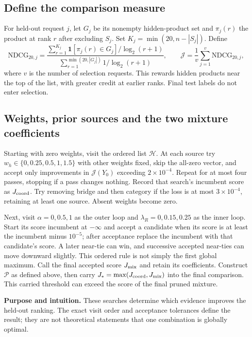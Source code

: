 \documentclass[11pt,a4paper]{article}
\newcommand{\why}{\par\textbf{Purpose and intuition.} }
\numberwithin{equation}{section}
\begin{document}
\subsection{Define the comparison measure}
For held-out request $j$, let $G_j$ be its nonempty hidden-product set and $\pi_j(r)$
the product at rank $r$ after excluding $S_j$. Set $K_j=\min(20,n-|S_j|)$. Define
\begin{equation}
\mathrm{NDCG}_{20,j}=\frac{\sum_{r=1}^{K_j}\mathbf1[\pi_j(r)\in G_j]/\log_2(r+1)}
{\sum_{r=1}^{\min(20,|G_j|)}1/\log_2(r+1)},\qquad
\mathcal J=\frac1v\sum_{j=1}^v\mathrm{NDCG}_{20,j},
\end{equation}
where $v$ is the number of selection requests. This rewards hidden products near the top
of the list, with greater credit at earlier ranks. Final test labels do not enter selection.

\subsection{Weights, prior sources and the two mixture coefficients}
Starting with zero weights, visit the ordered list $\mathcal H$. At each source try
$w_h\in\{0,0.25,0.5,1,1.5\}$ with other weights fixed, skip the all-zero vector, and
accept only improvements in $\mathcal J(Y_0)$ exceeding $2\times10^{-4}$. Repeat for at
most four passes, stopping if a pass changes nothing. Record that search's incumbent score
as $J_{\rm coord}$. Try removing bridge and then category if the loss is at most
$3\times10^{-4}$, retaining at least one source. Absent weights become zero.

Next, visit $\alpha=0,0.5,1$ as the outer loop and $\lambda_R=0,0.15,0.25$ as the inner
loop. Start its score incumbent at $-\infty$ and accept a candidate when its score is at
least the incumbent minus $10^{-5}$; after acceptance replace the incumbent with that
candidate's score. A later near-tie can win, and successive accepted near-ties can move
downward slightly. This ordered rule is not simply the first global maximum.
Call the final accepted score $J_{\rm mix}$ and retain its coefficients. Construct
$\mathcal P$ as defined above, then carry $J_*=\max(J_{\rm coord},J_{\rm mix})$ into
the final comparison. This carried threshold can exceed the score of the final pruned mixture.
\why These searches determine which evidence improves the held-out ranking. The exact
visit order and acceptance tolerances define the result; they are not theoretical
statements that one combination is globally optimal.
\end{document}
